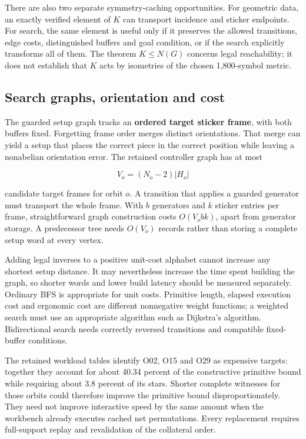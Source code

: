 \documentclass[
  10pt,
  a4paper,
]{article}
\begin{document}
There are also two separate symmetry-caching opportunities. For
geometric data, an exactly verified element of \(K\) can transport
incidence and sticker endpoints. For search, the same element is useful
only if it preserves the allowed transitions, edge costs, distinguished
buffers and goal condition, or if the search explicitly transforms all
of them. The theorem \(K\leq N(G)\) concerns legal reachability; it does
not establish that \(K\) acts by isometries of the chosen 1,800-symbol
metric.

\subsection{Search graphs, orientation and
cost}\label{search-graphs-orientation-and-cost}

The guarded setup graph tracks an \textbf{ordered target sticker frame},
with both buffers fixed. Forgetting frame order merges distinct
orientations. That merge can yield a setup that places the correct piece
in the correct position while leaving a nonabelian orientation error.
The retained controller graph has at most

\begin{equation}
V_o=(N_o-2)|H_o|
\end{equation}

candidate target frames for orbit \(o\). A transition that applies a
guarded generator must transport the whole frame. With \(b\) generators
and \(k\) sticker entries per frame, straightforward graph construction
costs \(O(V_obk)\), apart from generator storage. A predecessor tree
needs \(O(V_o)\) records rather than storing a complete setup word at
every vertex.

Adding legal inverses to a positive unit-cost alphabet cannot increase
any shortest setup distance. It may nevertheless increase the time spent
building the graph, so shorter words and lower build latency should be
measured separately. Ordinary BFS is appropriate for unit costs.
Primitive length, elapsed execution cost and ergonomic cost are
different nonnegative weight functions; a weighted search must use an
appropriate algorithm such as Dijkstra's algorithm. Bidirectional search
needs correctly reversed transitions and compatible fixed-buffer
conditions.

The retained workload tables identify O02, O15 and O29 as expensive
targets: together they account for about 40.34 percent of the
constructive primitive bound while requiring about 3.8 percent of its
stars. Shorter complete witnesses for those orbits could therefore
improve the primitive bound disproportionately. They need not improve
interactive speed by the same amount when the workbench already executes
cached net permutations. Every replacement requires full-support replay
and revalidation of the collateral order.
\end{document}
